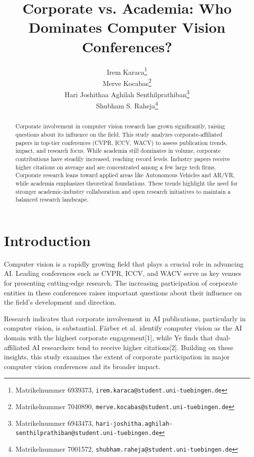 \documentclass{article}
\title{Corporate vs. Academia: Who Dominates Computer Vision Conferences?}
\author{
  \small Irem Karaca\thanks{Matrikelnummer 6939373, \texttt{irem.karaca@student.uni-tuebingen.de}}\\
  \And
  \small Merve Kocabas\thanks{Matrikelnummer 7040890, \texttt{merve.kocabas@student.uni-tuebingen.de}}\\
  \And
  \small Hari Joshithaa Aghilah Senthilprathiban\thanks{Matrikelnummer 6943473, \texttt{hari-joshitha.aghilah-senthilprathiban@student.uni-tuebingen.de}}\\
  \And
  \small Shubham S. Raheja\thanks{Matrikelnummer 7001572, \texttt{shubham.raheja@student.uni-tuebingen.de}}\\
}
\begin{document}
\maketitle
\vspace{-10pt}
\begin{abstract}

Corporate involvement in computer vision research has grown significantly, raising questions about its influence on the field. This study analyzes corporate-affiliated papers in top-tier conferences (CVPR, ICCV, WACV) to assess publication trends, impact, and research focus. While academia still dominates in volume, corporate contributions have steadily increased, reaching record levels. Industry papers receive higher citations on average and are concentrated among a few large tech firms. Corporate research leans toward applied areas like Autonomous Vehicles and AR/VR, while academia emphasizes theoretical foundations. These trends highlight the need for stronger academic-industry collaboration and open research initiatives to maintain a balanced research landscape.

\end{abstract}
\vspace{-10pt}

\section{Introduction}
\vspace{-7pt}
Computer vision is a rapidly growing field that plays a crucial role in advancing AI. Leading conferences such as CVPR, ICCV, and WACV serve as key venues for presenting cutting-edge research. The increasing participation of corporate entities in these conferences raises important questions about their influence on the field’s development and direction.

Research indicates that corporate involvement in AI publications, particularly in computer vision, is substantial. Färber et al. identify computer vision as the AI domain with the highest corporate engagement[1], while Ye finds that dual-affiliated AI researchers tend to receive higher citations[2]. Building on these insights, this study examines the extent of corporate participation in major computer vision conferences and its broader impact.
\end{document}
